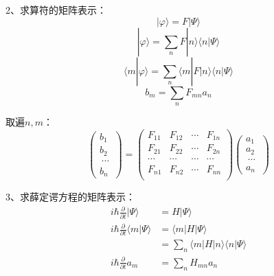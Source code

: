 \begin{frame} 
    \frametitle{}  
    2、求算符的矩阵表示：  
    $$|\varphi \rangle = F |\Psi \rangle$$
    $$|\varphi \rangle = \sum_n F |n\rangle\langle n |\Psi \rangle$$
    $$\langle m |\varphi \rangle = \sum_n  \langle m| F |n\rangle\langle n |\Psi \rangle$$
    $$ b_m = \sum_n  F_{mn} a_n$$

    取遍$n,m$：  
    $$\begin{pmatrix}
    b_1\\
    b_2\\\
    \cdots\\
    b_n\
    \end{pmatrix} 
    = 
    \begin{pmatrix}
        F_{11} & F_{12} & \cdots & F_{1n} \\
        F_{21} & F_{22} & \cdots & F_{2n} \\
        \cdots & \cdots &  \cdots &  \cdots \\
        F_{n1} & F_{n2} & \cdots & F_{nn} \\
    \end{pmatrix} 
    \begin{pmatrix}
        a_1\\
        a_2\\\
        \cdots\\
        a_n\
    \end{pmatrix} 
    $$
\end{frame} 

\begin{frame} 
    3、求薛定谔方程的矩阵表示： 
    $$ \begin{aligned}
    i \hbar \frac{\partial}{\partial t} |\Psi \rangle &= H |\Psi \rangle  \\
    i \hbar \frac{\partial}{\partial t} \langle m |\Psi \rangle &= \langle m |H |\Psi \rangle \\ 
     &= \sum_n \langle m |H |n\rangle\langle n |\Psi \rangle  \\
     i \hbar \frac{\partial}{\partial t} a_m  &= \sum_n H_{mn} a_n 
    \end{aligned}
    $$
\end{frame} 


